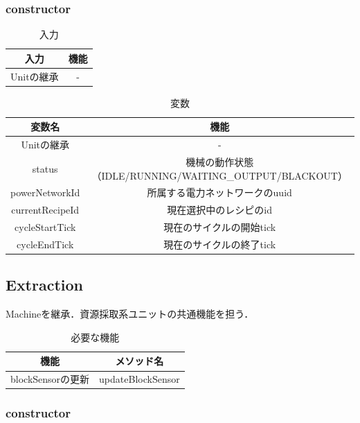 \documentclass[uplatex,dvipdfmx,report]{jlreq}
\begin{document}
\subsubsection{constructor}

\begin{table}[H]
    \centering
    \caption{入力}
    \begin{tabular}{cc}
        \hline
        入力 & 機能 \\
        \hline
        \hline
        Unitの継承 & - \\
        \hline
    \end{tabular}
\end{table}

\begin{table}[H]
    \centering
    \caption{変数}
    \begin{tabular}{cc}
        \hline
        変数名 & 機能 \\
        \hline
        \hline
        Unitの継承 & - \\
        status & 機械の動作状態（IDLE/RUNNING/WAITING\_OUTPUT/BLACKOUT） \\
        powerNetworkId & 所属する電力ネットワークのuuid \\
        currentRecipeId & 現在選択中のレシピのid \\
        cycleStartTick & 現在のサイクルの開始tick \\
        cycleEndTick & 現在のサイクルの終了tick \\
        \hline
    \end{tabular}
\end{table}

\subsection{Extraction}

Machineを継承．資源採取系ユニットの共通機能を担う．

\begin{table}[H]
    \centering
    \caption{必要な機能}
    \begin{tabular}{cc}
        \hline
        機能 & メソッド名 \\
        \hline
        \hline
        blockSensorの更新 & updateBlockSensor \\
        \hline
    \end{tabular}
\end{table}

\subsubsection{constructor}
\end{document}
